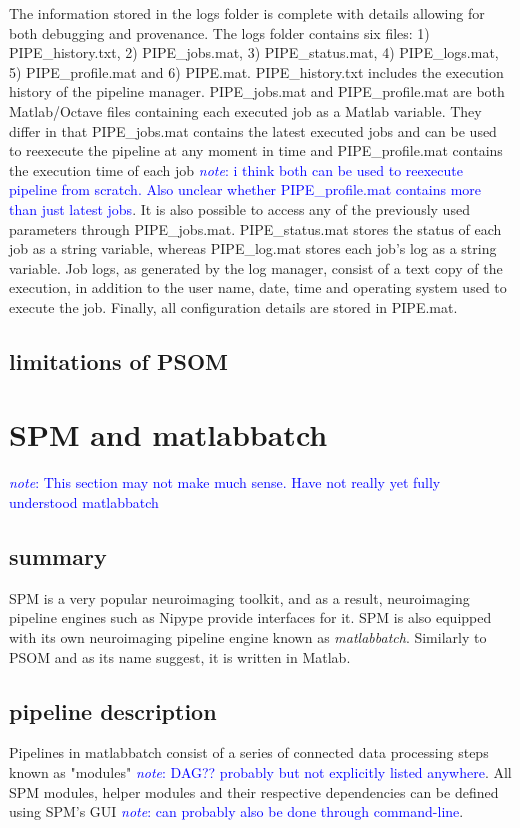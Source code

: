\documentclass{report}
\newcommand{\note}[1]{\textcolor{blue}{\textit{note}: #1}}
\begin{document}
        The information stored in the logs folder is complete with details
        allowing for both debugging and provenance. The logs folder contains six
        files: 1) PIPE\_history.txt, 2) PIPE\_jobs.mat, 3) PIPE\_status.mat, 4)
        PIPE\_logs.mat, 5) PIPE\_profile.mat and 6) PIPE.mat. PIPE\_history.txt
        includes the execution history of the pipeline manager. PIPE\_jobs.mat
        and PIPE\_profile.mat are both Matlab/Octave files containing each
        executed job as a Matlab variable. They differ in that PIPE\_jobs.mat
        contains the latest executed jobs and can be used to reexecute the
        pipeline at any moment in time and PIPE\_profile.mat contains the
        execution time of each job \note{i think both can be used to reexecute
        pipeline from scratch. Also unclear whether PIPE\_profile.mat contains
        more than just latest jobs}. It is also possible to access any of the
        previously used parameters through PIPE\_jobs.mat. PIPE\_status.mat
        stores the status of each job as a string variable, whereas
        PIPE\_log.mat stores each job's log as a string variable. Job logs, as
        generated by the log manager, consist of a text copy of the execution,
        in addition to the user name, date, time and operating system used to
        execute the job. Finally, all configuration details are stored in
        PIPE.mat. 
       
        \subsection{limitations of PSOM} \section{SPM and matlabbatch}
        \note{This section may not make much sense. Have not really yet fully
        understood matlabbatch} \subsection{summary} SPM is a very popular
        neuroimaging toolkit, and as a result, neuroimaging pipeline engines
        such as Nipype provide interfaces for it. SPM is also equipped with its
        own neuroimaging pipeline engine known as \textit{matlabbatch}.
        Similarly to PSOM and as its name suggest, it is written in Matlab.

        \subsection{pipeline description} Pipelines in matlabbatch consist of a
        series of connected data processing steps known as "modules" \note{DAG??
        probably but not explicitly listed anywhere}. All SPM modules, helper
        modules and their respective dependencies can be defined using SPM's GUI
        \note{can probably also be done through command-line}.
\end{document}
